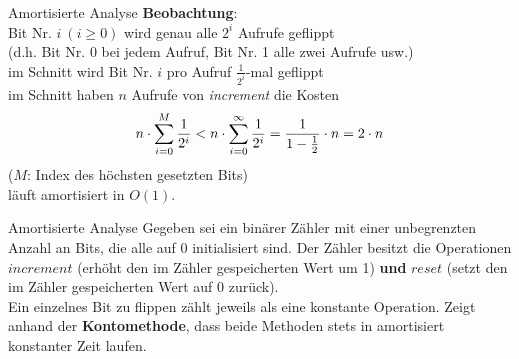 \begin{frame}{Amortisierte Analyse}
	\solutionheading \smallskip
	\textbf{Beobachtung}: \\
	Bit Nr. $i\ (i \geq 0)$ wird genau alle $2^i$ Aufrufe geflippt \\
	{\small \hanging (d.h. Bit Nr. 0 bei jedem Aufruf, Bit Nr. 1 alle zwei Aufrufe usw.)} \\
	\pause
	\impl im Schnitt wird Bit Nr. $i$ pro Aufruf $\frac{1}{2^i}$-mal geflippt \\
	\pause
	\impl im Schnitt haben $n$ Aufrufe von \textit{increment} die Kosten \[
		n \cdot \sum\limits_{i=0}^{M} \frac{1}{2^i} < n \cdot \sum\limits_{i=0}^{\infty} \frac{1}{2^i} =
		\frac{1}{1-\fract 1/2 } \* n = 2 \cdot n
	\] ($M$: Index des höchsten gesetzten Bits) \\
	\pause
	\impl läuft amortisiert in $O(1)$.
\end{frame}



\begin{frame}{Amortisierte Analyse}
	Gegeben sei ein binärer Zähler mit einer unbegrenzten Anzahl an Bits, die alle auf 0 initialisiert sind. Der Zähler besitzt die Operationen $increment$ (erhöht den im Zähler gespeicherten Wert um 1) \textbf{und} $reset$ (setzt den im Zähler gespeicherten Wert auf 0 zurück). \\
	\smallskip
	Ein einzelnes Bit zu flippen zählt jeweils als eine konstante Operation. Zeigt anhand der \textbf{Kontomethode}, dass beide Methoden stets in amortisiert konstanter Zeit laufen.
\end{frame}

